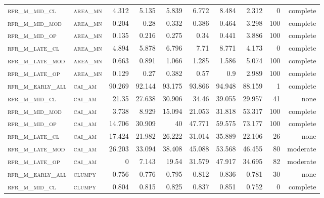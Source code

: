\begin{landscape}
\begin{center}
\begin{footnotesize}
\begin{longtable}{llrrrrr|rrr}
\textsc{rfr\_m\_mid\_cl   } & \textsc{area\_mn  }   & 4.312   & 5.135   & 5.839   & 6.772    & 8.484    & 2.312   & 0   & complete \\
\textsc{rfr\_m\_mid\_mod  } & \textsc{area\_mn  }   & 0.204   & 0.28    & 0.332   & 0.386    & 0.464    & 3.298   & 100 & complete \\
\textsc{rfr\_m\_mid\_op   } & \textsc{area\_mn  }   & 0.135   & 0.216   & 0.275   & 0.34     & 0.441    & 3.886   & 100 & complete \\
\textsc{rfr\_m\_late\_cl  } & \textsc{area\_mn  }   & 4.894   & 5.878   & 6.796   & 7.71     & 8.771    & 4.173   & 0   & complete \\
\textsc{rfr\_m\_late\_mod } & \textsc{area\_mn  }   & 0.663   & 0.891   & 1.066   & 1.285    & 1.586    & 5.074   & 100 & complete \\
\textsc{rfr\_m\_late\_op  } & \textsc{area\_mn  }   & 0.129   & 0.27    & 0.382   & 0.57     & 0.9      & 2.989   & 100 & complete \\
\textsc{rfr\_m\_early\_all} & \textsc{cai\_am   }   & 90.269  & 92.144  & 93.175  & 93.866   & 94.948   & 88.159  & 1   & complete \\
\textsc{rfr\_m\_mid\_cl   } & \textsc{cai\_am   }   & 21.35   & 27.638  & 30.906  & 34.46    & 39.055   & 29.957  & 41  & none     \\
\textsc{rfr\_m\_mid\_mod  } & \textsc{cai\_am   }   & 3.738   & 8.929   & 15.094  & 21.053   & 31.818   & 53.317  & 100 & complete \\
\textsc{rfr\_m\_mid\_op   } & \textsc{cai\_am   }   & 14.706  & 30.909  & 40      & 47.771   & 59.575   & 73.177  & 100 & complete \\
\textsc{rfr\_m\_late\_cl  } & \textsc{cai\_am   }   & 17.424  & 21.982  & 26.222  & 31.014   & 35.889   & 22.106  & 26  & none     \\
\textsc{rfr\_m\_late\_mod } & \textsc{cai\_am   }   & 26.203  & 33.094  & 38.408  & 45.088   & 53.568   & 46.455  & 80  & moderate \\
\textsc{rfr\_m\_late\_op  } & \textsc{cai\_am   }   & 0       & 7.143   & 19.54   & 31.579   & 47.917   & 34.695  & 82  & moderate \\
\textsc{rfr\_m\_early\_all} & \textsc{clumpy    }   & 0.756   & 0.776   & 0.795   & 0.812    & 0.836    & 0.781   & 30  & none     \\
\textsc{rfr\_m\_mid\_cl   } & \textsc{clumpy    }   & 0.804   & 0.815   & 0.825   & 0.837    & 0.851    & 0.752   & 0   & complete \\

\end{longtable}
\end{footnotesize}
\end{center}
\end{landscape}
